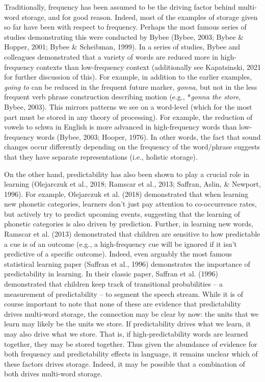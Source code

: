 \documentclass[
  man,floatsintext]{apa6}
\begin{document}
Traditionally, frequency has been assumed to be the driving factor behind multi-word storage, and for good reason. Indeed, most of the examples of storage given so far have been with respect to frequency. Perhaps the most famous series of studies demonstrating this were conducted by Bybee (Bybee, 2003; Bybee \& Hopper, 2001; Bybee \& Scheibman, 1999). In a series of studies, Bybee and colleagues demonstrated that a variety of words are reduced more in high-frequency contexts than low-frequency context (additionally see Kapatsinski, 2021 for further discussion of this). For example, in addition to the earlier examples, \emph{going to} can be reduced in the frequent future marker, \emph{gonna}, but not in the less frequent verb phrase construction describing motion (e.g., *\emph{gonna the store}, Bybee, 2003). This mirrors patterns we see on a word-level (which for the most part must be stored in any theory of processing). For example, the reduction of vowels to schwa in English is more advanced in high-frequency words than low-frequency words (Bybee, 2003; Hooper, 1976). In other words, the fact that sound changes occur differently depending on the frequency of the word/phrase suggests that they have separate representations (i.e., holistic storage).

On the other hand, predictability has also been shown to play a crucial role in learning (Olejarczuk et al., 2018; Ramscar et al., 2013; Saffran, Aslin, \& Newport, 1996). For example, Olejarczuk et al. (2018) demonstrated that when learning new phonetic categories, learners don't just pay attention to co-occurrence rates, but actively try to predict upcoming events, suggesting that the learning of phonetic categories is also driven by prediction. Further, in learning new words, Ramscar et al. (2013) demonstrated that children are sensitive to how predictable a cue is of an outcome (e.g., a high-frequency cue will be ignored if it isn't predictive of a specific outcome). Indeed, even arguably the most famous statistical learning paper (Saffran et al., 1996) demonstrates the importance of predictability in learning. In their classic paper, Saffran et al. (1996) demonstrated that children keep track of transitional probabilities -- a measurement of predictability -- to segment the speech stream. While it is of course important to note that none of these are evidence that predictability drives multi-word storage, the connection may be clear by now: the units that we learn may likely be the units we store. If predictability drives what we learn, it may also drive what we store. That is, if high-predictability words are learned together, they may be stored together. Thus given the abundance of evidence for both frequency and predictability effects in language, it remains unclear which of these factors drives storage. Indeed, it may be possible that a combination of both drives multi-word storage.
\end{document}
